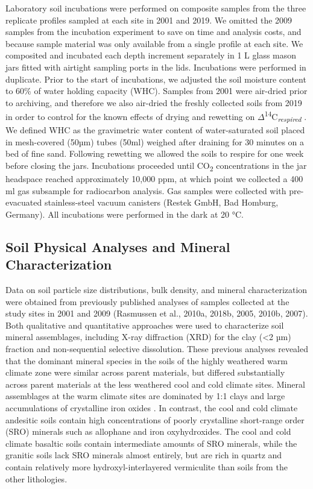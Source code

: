 \documentclass[soil, manuscript]{copernicus}
\begin{document}
Laboratory soil incubations were performed on composite samples from the
three replicate profiles sampled at each site in 2001 and 2019. We
omitted the 2009 samples from the incubation experiment to save on time
and analysis costs, and because sample material was only available from
a single profile at each site. We composited and incubated each depth
increment separately in 1 L glass mason jars fitted with airtight
sampling ports in the lids. Incubations were performed in duplicate.
Prior to the start of incubations, we adjusted the soil moisture content
to 60\% of water holding capacity (WHC). Samples from 2001 were
air-dried prior to archiving, and therefore we also air-dried the
freshly collected soils from 2019 in order to control for the known
effects of drying and rewetting on
\(\Delta\)\textsuperscript{14}C\textsubscript{\emph{respired}}
\citep{beem-miller2021}. We defined WHC as the gravimetric water content
of water-saturated soil placed in mesh-covered (50µm) tubes (50ml)
weighed after draining for 30 minutes on a bed of fine sand. Following
rewetting we allowed the soils to respire for one week before closing
the jars. Incubations proceeded until CO\textsubscript{2} concentrations
in the jar headspace reached approximately 10,000 ppm, at which point we
collected a 400 ml gas subsample for radiocarbon analysis. Gas samples
were collected with pre-evacuated stainless-steel vacuum canisters
(Restek GmbH, Bad Homburg, Germany). All incubations were performed in
the dark at 20 °C.

\subsection{Soil Physical Analyses and Mineral Characterization}

Data on soil particle size distributions, bulk density, and mineral
characterization were obtained from previously published analyses of
samples collected at the study sites in 2001 and 2009 (Rasmussen et al.,
2010a, 2018b, 2005, 2010b, 2007). Both qualitative and quantitative
approaches were used to characterize soil mineral assemblages, including
X-ray diffraction (XRD) for the clay (\textless{}2 µm) fraction and
non-sequential selective dissolution. These previous analyses revealed
that the dominant mineral species in the soils of the highly weathered
warm climate zone were similar across parent materials, but differed
substantially across parent materials at the less weathered cool and
cold climate sites. Mineral assemblages at the warm climate sites are
dominated by 1:1 clays and large accumulations of crystalline iron
oxides \citep{rasmussen2010b, dahlgren1997, rasmussen2010a}. In
contrast, the cool and cold climate andesitic soils contain high
concentrations of poorly crystalline short-range order (SRO) minerals
such as allophane and iron oxyhydroxides. The cool and cold climate
basaltic soils contain intermediate amounts of SRO minerals, while the
granitic soils lack SRO minerals almost entirely, but are rich in quartz
and contain relatively more hydroxyl-interlayered vermiculite than soils
from the other lithologies.
\end{document}

